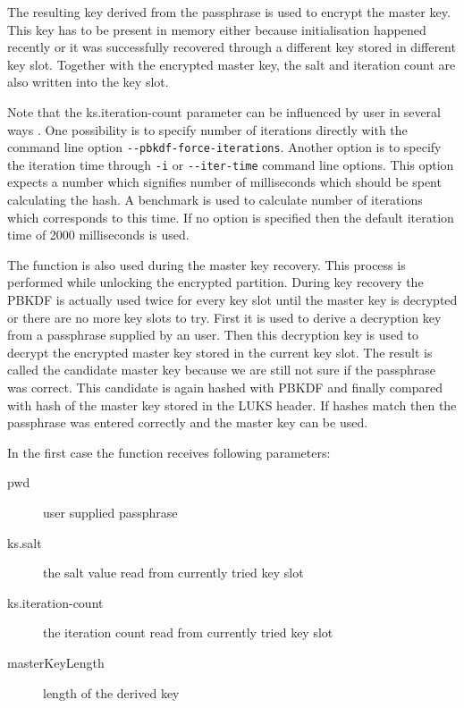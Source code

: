 \documentclass[nolof]{fithesis3}
\begin{document}
The resulting key derived from the passphrase is used to encrypt the master key. This key has to be present in memory either because initialisation happened recently or it was successfully recovered through a different key stored in different key slot. Together with the encrypted master key, the salt and iteration count are also written into the key slot.

Note that the ks.iteration-count parameter can be influenced by user in several ways \parencite{cryptsetupmanual}. One possibility is to specify number of iterations directly with the command line option \verb+--pbkdf-force-iterations+. Another option is to specify the iteration time through \verb+-i+ or \verb+--iter-time+ command line options. This option expects a number which signifies number of milliseconds which should be spent calculating the hash. A benchmark is used to calculate number of iterations which corresponds to this time. If no option is specified then the default iteration time of 2000 milliseconds is used.

The function is also used during the master key recovery. This process is performed while unlocking the encrypted partition. During key recovery the PBKDF is actually used twice for every key slot until the master key is decrypted or there are no more key slots to try. First it is used to derive a decryption key from a passphrase supplied by an user. Then this decryption key is used to decrypt the encrypted master key stored in the current key slot. The result is called the candidate master key because we are still not sure if the passphrase was correct. This candidate is again hashed with PBKDF and finally compared with hash of the master key stored in the LUKS header. If hashes match then the passphrase was entered correctly and the master key can be used.

In the first case the function receives following parameters:

\begin{description}
\item[pwd] user supplied passphrase

\item[ks.salt] the salt value read from currently tried key slot

\item[ks.iteration-count] the iteration count read from currently tried key slot

\item[masterKeyLength] length of the derived key
\end{description}
\end{document}

